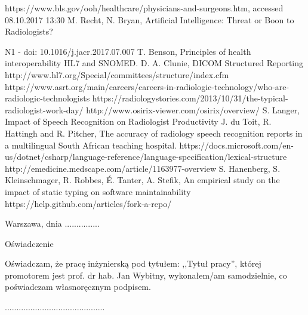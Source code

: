 \documentclass[12pt, twoside, openany]{report}
\theoremstyle{definition}
\begin{document}
\begin{thebibliography}{11}
 https://www.bls.gov/ooh/healthcare/physicians-and-surgeons.htm, accessed 08.10.2017 13:30
 M. Recht, N. Bryan, Artificial Intelligence: Threat or Boon to Radiologists?

N1  - doi: 10.1016/j.jacr.2017.07.007
 T. Benson, Principles of health interoperability HL7 and SNOMED.
 D. A. Clunie, DICOM Structured Reporting
 http://www.hl7.org/Special/committees/structure/index.cfm 
 https://www.asrt.org/main/careers/careers-in-radiologic-technology/who-are-radiologic-technologists
 https://radiologystories.com/2013/10/31/the-typical-radiologist-work-day/
http://www.osirix-viewer.com/osirix/overview/
S. Langer, Impact of Speech Recognition on Radiologist Productivity
 J. du Toit, R. Hattingh and R. Pitcher, The accuracy of radiology speech recognition
reports in a multilingual South African teaching hospital.
https://docs.microsoft.com/en-us/dotnet/csharp/language-reference/language-specification/lexical-structure
 http://emedicine.medscape.com/article/1163977-overview
    S. Hanenberg, S. Kleinschmager, R. Robbes, É. Tanter, A. Stefik, An empirical study on the impact of static typing on software maintainability
 https://help.github.com/articles/fork-a-repo/
\end{thebibliography}
\clearpage
\begin{otherlanguage}{polish}
\pagestyle{empty}
\noindent Warszawa, dnia ...............
\vspace{5cm}
\begin{center}
\LARGE{Oświadczenie}
\end{center}
Oświadczam, że pracę inżynierską pod tytułem: ,,Tytuł pracy'', której promotorem jest prof. dr hab. Jan Wybitny, wykonałem/am samodzielnie, co poświadczam własnoręcznym podpisem.
\vspace{2cm}
\begin{flushright}
...........................................
\end{flushright}
\end{otherlanguage}
\end{document}
